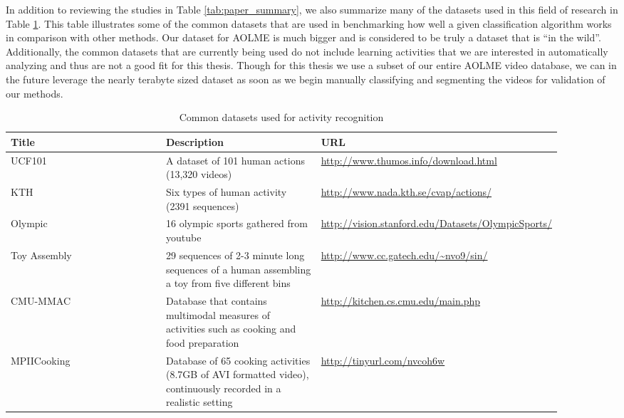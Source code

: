\FloatBarrier

In addition to reviewing the studies in Table \ref{tab:paper_summary},  we also
summarize many of the datasets used in this field of research in Table
\ref{tab:common_datasets}. This table illustrates some of the common datasets
that are used in benchmarking how well a given classification algorithm works in
comparison with other methods. Our dataset for AOLME is much bigger and is
considered to be truly a dataset that is ``in the wild''. Additionally, the
common datasets that are currently being used do not include learning activities
that we are interested in automatically analyzing and thus are not a good fit
for this thesis. Though for this thesis we  use a subset of our entire AOLME
video database, we can in the future leverage the nearly terabyte sized dataset
as soon as we begin manually classifying and segmenting the videos for
validation of our methods.

\begin{singlespace}
  \begin{table}[h]
  \begin{centering}
    \begin{tabular}{ | p{0.3\linewidth} | p{0.3\linewidth} | p{0.3\linewidth} |  }
      \hline
      \textbf{Title} & \textbf{Description} & \textbf{URL} \\
      \hline
      UCF101 \cite{soomro2012ucf101}& A dataset of 101 human actions (13,320 videos) &
      \url{http://www.thumos.info/download.html} \\
      \hline
      KTH & Six types of human activity (2391 sequences) & \url{http://www.nada.kth.se/cvap/actions/} \\
      \hline
      Olympic \cite{niebles2010modeling} & 16 olympic sports gathered from youtube &
       \url{http://vision.stanford.edu/Datasets/OlympicSports/} \\
      \hline
      Toy Assembly \cite{vo2014stochastic} & 29 sequences of 2-3 minute long sequences
      of a human assembling a toy from five different bins & \url{http://www.cc.gatech.edu/~nvo9/sin/} \\
      \hline
      CMU-MMAC \cite{spriggs2009temporal} & Database that contains multimodal measures of activities such as
      cooking and food preparation & \url{http://kitchen.cs.cmu.edu/main.php} \\
      \hline
      MPIICooking \cite{rohrbach2012database} & Database of 65 cooking activities (8.7GB of AVI formatted video),
      continuously recorded in a realistic setting & \url{http://tinyurl.com/nvcoh6w} \\
      \hline
    \end{tabular}
    \caption{Common datasets used for activity recognition}
    \label{tab:common_datasets}
  \end{centering}
\end{table}
\end{singlespace}

